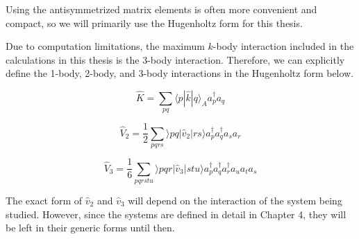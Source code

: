 	Using the antisymmetrized matrix elements is often more convenient and compact, so we will primarily use the Hugenholtz form for this thesis.  

	Due to computation limitations, the maximum $k$-body interaction included in the calculations in this thesis is the 3-body interaction. Therefore, we can explicitly define the 1-body, 2-body, and 3-body interactions in the Hugenholtz form below.

	\begin{equation}
		\hat{K} = \sum_{pq}\langle p | \hat{k} | q \rangle_A a^\dagger_pa_q
	\end{equation}

	\begin{equation}
		\hat{V}_2 = \frac{1}{2}\sum_{pqrs}\rangle pq|\hat{v}_2|rs\rangle a^\dagger_p a^\dagger_q a_s a_r
	\end{equation}

	\begin{equation}
		\hat{V}_3 = \frac{1}{6}\sum_{pqrstu} \rangle pqr | \hat{v}_3 | stu \rangle a^\dagger_p a^\dagger_q a^\dagger_r a_u a_t a_s
	\end{equation}

	The exact form of $\hat{v}_2$ and $\hat{v}_3$ will depend on the interaction of the system being studied. However, since the systems are defined in detail in Chapter 4, they will be left in their generic forms until then.